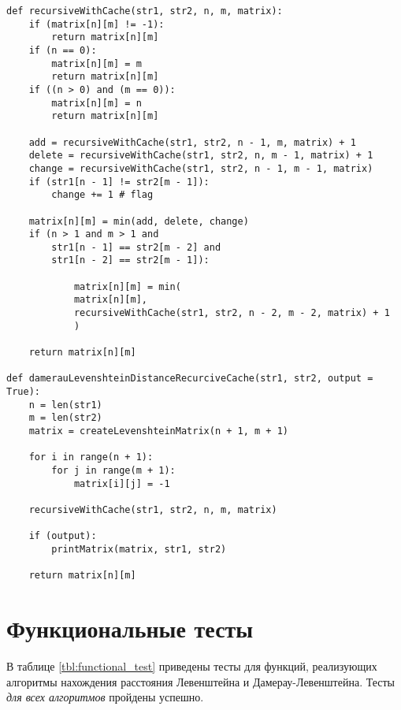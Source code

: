 \begin{center}
    \captionsetup{justification=raggedright,singlelinecheck=off}
    \begin{lstlisting}[label=lst:dam_lev_rec_cache,caption=Алгоритм нахождения расстояния Дамерау-Левенштейна (рекурсивный с использованием кеша)]
def recursiveWithCache(str1, str2, n, m, matrix):
	if (matrix[n][m] != -1):
		return matrix[n][m]
	if (n == 0):
		matrix[n][m] = m
		return matrix[n][m]
	if ((n > 0) and (m == 0)):
		matrix[n][m] = n
		return matrix[n][m]
	
	add = recursiveWithCache(str1, str2, n - 1, m, matrix) + 1
	delete = recursiveWithCache(str1, str2, n, m - 1, matrix) + 1
	change = recursiveWithCache(str1, str2, n - 1, m - 1, matrix)
	if (str1[n - 1] != str2[m - 1]):
		change += 1 # flag
	
	matrix[n][m] = min(add, delete, change)
	if (n > 1 and m > 1 and
		str1[n - 1] == str2[m - 2] and
		str1[n - 2] == str2[m - 1]):
	
			matrix[n][m] = min(
			matrix[n][m],
			recursiveWithCache(str1, str2, n - 2, m - 2, matrix) + 1
			)
	
	return matrix[n][m]

def damerauLevenshteinDistanceRecurciveCache(str1, str2, output = True):
	n = len(str1)
	m = len(str2)
	matrix = createLevenshteinMatrix(n + 1, m + 1)
	
	for i in range(n + 1):
		for j in range(m + 1):
			matrix[i][j] = -1
		
	recursiveWithCache(str1, str2, n, m, matrix)
	
	if (output):
		printMatrix(matrix, str1, str2)
	
	return matrix[n][m]

\end{lstlisting}
\end{center}

\section{Функциональные тесты}

В таблице \ref{tbl:functional_test} приведены тесты для функций, реализующих алгоритмы нахождения расстояния Левенштейна и Дамерау-Левенштейна. Тесты \textit{для всех алгоритмов} пройдены успешно.

